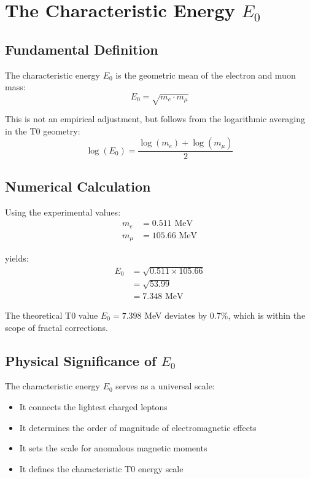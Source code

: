 \documentclass[12pt,a4paper]{article}
\newcommand{\Ezero}{E_0}
\begin{document}
	\section{The Characteristic Energy $\Ezero$}
	
	\subsection{Fundamental Definition}
	
	The characteristic energy $\Ezero$ is the geometric mean of the electron and muon mass:
	\begin{equation}
		\boxed{\Ezero = \sqrt{m_e \cdot m_\mu}}
		\label{eq:E0_fundamental}
	\end{equation}
	
	This is not an empirical adjustment, but follows from the logarithmic averaging in the T0 geometry:
	\begin{equation}
		\log(\Ezero) = \frac{\log(m_e) + \log(m_\mu)}{2}
		\label{eq:E0_logarithmic}
	\end{equation}
	
	\subsection{Numerical Calculation}
	
	Using the experimental values:
	\begin{align}
		m_e &= 0.511 \text{ MeV}\\
		m_\mu &= 105.66 \text{ MeV}
	\end{align}
	
	yields:
	\begin{align}
		\Ezero &= \sqrt{0.511 \times 105.66}\\
		&= \sqrt{53.99}\\
		&= 7.348 \text{ MeV}
	\end{align}
	
	The theoretical T0 value $\Ezero = 7.398$ MeV deviates by 0.7\%, which is within the scope of fractal corrections.
	
	\subsection{Physical Significance of $\Ezero$}
	
	The characteristic energy $\Ezero$ serves as a universal scale:
	\begin{itemize}
		\item It connects the lightest charged leptons
		\item It determines the order of magnitude of electromagnetic effects
		\item It sets the scale for anomalous magnetic moments
		\item It defines the characteristic T0 energy scale
	\end{itemize}
	
\end{document}
